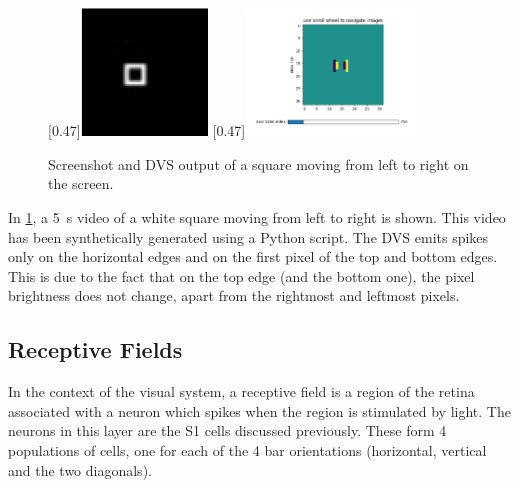 \begin{figure}[ht]
\centering
{}
  [0.47\textwidth]{\includegraphics[width=0.30\textwidth]{images/development/dvs_square_lr.png}}
  [0.47\textwidth]{\includegraphics[width=0.4\textwidth]{images/development/spikes_square_lr.png}}
\caption[DVS Output of a Square]{Screenshot and DVS output of a square moving from left to right on the screen.}
\label{fig:square_lr}
\end{figure}

In \cref{fig:square_lr}, a \SI{5}{s} video of a white square moving from left to right is shown. This video has been synthetically generated using a Python script. The DVS emits spikes only on the horizontal edges and on the first pixel of the top and bottom edges. This is due to the fact that on the top edge (and the bottom one), the pixel brightness does not change, apart from the rightmost and leftmost pixels.

\subsection{Receptive Fields}
In the context of the visual system, a receptive field is a region of the retina associated with a neuron which spikes when the region is stimulated by light. The neurons in this layer are the \textsc{S1} cells discussed previously. These form 4 populations of cells, one for each of the 4 bar orientations (horizontal, vertical and the two diagonals). 

